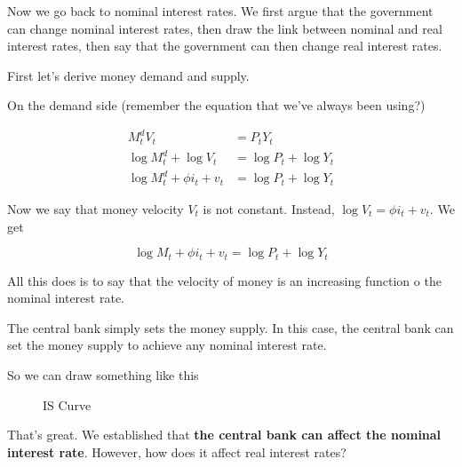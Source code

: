 \documentclass[11pt]{scrartcl}
\begin{document}
Now we go back to nominal interest rates. We first argue that the government can change nominal interest rates, then draw the link between nominal and real interest rates, then say that the government can then change real interest rates. 

First let's derive money demand and supply.

On the demand side (remember the equation that we've always been using?)

\begin{align*}
M^d_t V_t &= P_t Y_t \\ 
\log{M^d_t} + \log{V_t} &= \log{P_t} + \log{Y_t} \\
\log{M^d_t} + \phi i_t + v_t &= \log{P_t} + \log{Y_t}
\end{align*}

Now we say that money velocity $V_t$ is not constant. Instead, $\log{V_t} = \phi i_t + v_t$. We get

\[ \log{M_t} + \phi i_t + v_t = \log{P_t} + \log{Y_t} \] 

All this does is to say that the velocity of money is an increasing function o the nominal interest rate.

The central bank simply sets the money supply. In this case, the central bank can set the money supply to achieve any nominal interest rate.

So we can draw something like this

\begin{figure}[H]
\centering
{}
\caption{\color{blue}IS Curve}
\end{figure}

That's great. We established that \textbf{the central bank can affect the nominal interest rate}. However, how does it affect real interest rates?
\end{document}
